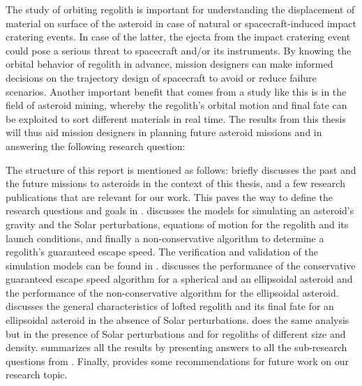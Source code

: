 %
\newline\newline
%
The study of orbiting regolith is important for understanding the displacement of material on surface of the asteroid in case of natural or spacecraft-induced impact cratering events. In case of the latter, the ejecta from the impact cratering event could pose a serious threat to spacecraft and/or its instruments. By knowing the orbital behavior of regolith in advance, mission designers can make informed decisions on the trajectory design of spacecraft to avoid or reduce failure scenarios. Another important benefit that comes from a study like this is in the field of asteroid mining, whereby the regolith's orbital motion and final fate can be exploited to sort different materials in real time. The results from this thesis will thus aid mission designers in planning future asteroid missions and in answering the following research question:
\vspace{5mm}
\begin{center}
\end{center}
\vspace{5mm}
The structure of this report is mentioned as follows:  briefly discusses the past and the future missions to asteroids in the context of this thesis, and a few research publications that are relevant for our work. This paves the way to define the research questions and goals in .  discusses the models for simulating an asteroid's gravity and the Solar perturbations, equations of motion for the regolith and its launch conditions, and finally a non-conservative algorithm to determine a regolith's guaranteed escape speed. The verification and validation of the simulation models can be found in .  discusses the performance of the conservative guaranteed escape speed algorithm for a spherical and an ellipsoidal asteroid and the performance of the non-conservative algorithm for the ellipsoidal asteroid.  discusses the general characteristics of lofted regolith and its final fate for an ellipsoidal asteroid in the absence of Solar perturbations.  does the same analysis but in the presence of Solar perturbations and for regoliths of different size and density.  summarizes all the results by presenting answers to all the sub-research questions from . Finally,  provides some recommendations for future work on our research topic.

